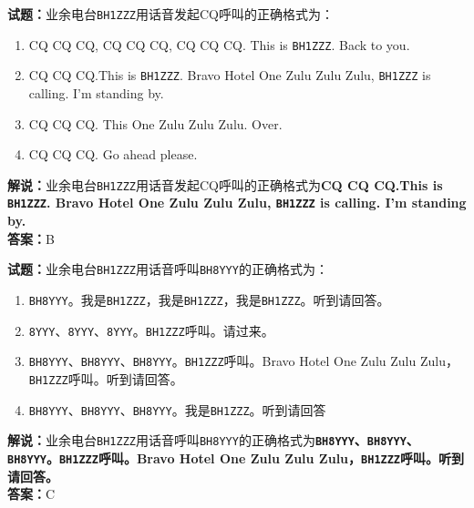 \documentclass{ctexbook}
\begin{document}
\vspace{\baselineskip}

\noindent\textbf{试题：}业余电台\texttt{BH1ZZZ}用话音发起CQ呼叫的正确格式为：
\begin{enumerate}[leftmargin=3em]
  \item CQ CQ CQ, CQ CQ CQ, CQ CQ CQ. This is \texttt{BH1ZZZ}. Back to you.
  \item CQ CQ CQ.This is \texttt{BH1ZZZ}. Bravo Hotel One Zulu Zulu Zulu, \texttt{BH1ZZZ} is calling. I’m standing by.
  \item CQ CQ CQ. This One Zulu Zulu Zulu. Over.
  \item CQ CQ CQ. Go ahead please.
\end{enumerate}
\noindent\textbf{解说：}业余电台\texttt{BH1ZZZ}用话音发起CQ呼叫的正确格式为\textbf{CQ CQ CQ.This is \texttt{BH1ZZZ}. Bravo Hotel One Zulu Zulu Zulu, \texttt{BH1ZZZ} is calling. I’m standing by.}\\
\noindent\textbf{答案：}B

\vspace{\baselineskip}

\noindent\textbf{试题：}业余电台\texttt{BH1ZZZ}用话音呼叫\texttt{BH8YYY}的正确格式为：
\begin{enumerate}[leftmargin=3em]
  \item \texttt{BH8YYY}。我是\texttt{BH1ZZZ}，我是\texttt{BH1ZZZ}，我是\texttt{BH1ZZZ}。听到请回答。
  \item \texttt{8YYY}、\texttt{8YYY}、\texttt{8YYY}。\texttt{BH1ZZZ}呼叫。请过来。
  \item \texttt{BH8YYY}、\texttt{BH8YYY}、\texttt{BH8YYY}。\texttt{BH1ZZZ}呼叫。Bravo Hotel One Zulu Zulu Zulu，\texttt{BH1ZZZ}呼叫。听到请回答。
  \item \texttt{BH8YYY}、\texttt{BH8YYY}、\texttt{BH8YYY}。我是\texttt{BH1ZZZ}。听到请回答
\end{enumerate}
\noindent\textbf{解说：}业余电台\texttt{BH1ZZZ}用话音呼叫\texttt{BH8YYY}的正确格式为\textbf{\texttt{BH8YYY}、\texttt{BH8YYY}、\texttt{BH8YYY}。\texttt{BH1ZZZ}呼叫。Bravo Hotel One Zulu Zulu Zulu，\texttt{BH1ZZZ}呼叫。听到请回答。}\\
\noindent\textbf{答案：}C

\vspace{\baselineskip}
\end{document}
